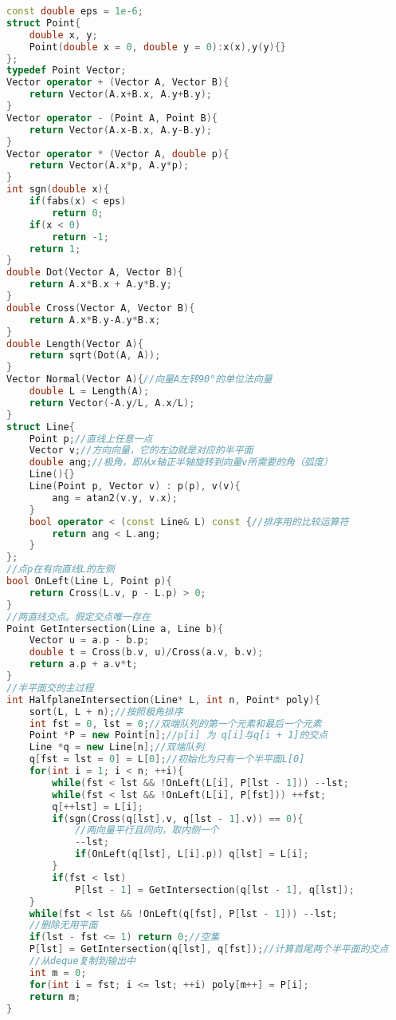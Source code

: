 \begin{lstlisting}[language=C++]
const double eps = 1e-6;
struct Point{
    double x, y;
    Point(double x = 0, double y = 0):x(x),y(y){}
};
typedef Point Vector;
Vector operator + (Vector A, Vector B){
    return Vector(A.x+B.x, A.y+B.y);
}
Vector operator - (Point A, Point B){
    return Vector(A.x-B.x, A.y-B.y);
}
Vector operator * (Vector A, double p){
    return Vector(A.x*p, A.y*p);
}
int sgn(double x){
    if(fabs(x) < eps)
        return 0;
    if(x < 0)
        return -1;
    return 1;
}
double Dot(Vector A, Vector B){
    return A.x*B.x + A.y*B.y;
}
double Cross(Vector A, Vector B){
    return A.x*B.y-A.y*B.x;
}
double Length(Vector A){
    return sqrt(Dot(A, A));
}
Vector Normal(Vector A){//向量A左转90°的单位法向量
    double L = Length(A);
    return Vector(-A.y/L, A.x/L);
}
struct Line{
    Point p;//直线上任意一点
    Vector v;//方向向量，它的左边就是对应的半平面
    double ang;//极角，即从x轴正半轴旋转到向量v所需要的角（弧度）
    Line(){}
    Line(Point p, Vector v) : p(p), v(v){
        ang = atan2(v.y, v.x);
    }
    bool operator < (const Line& L) const {//排序用的比较运算符
        return ang < L.ang;
    }
};
//点p在有向直线L的左侧
bool OnLeft(Line L, Point p){
    return Cross(L.v, p - L.p) > 0;
}
//两直线交点。假定交点唯一存在
Point GetIntersection(Line a, Line b){
    Vector u = a.p - b.p;
    double t = Cross(b.v, u)/Cross(a.v, b.v);
    return a.p + a.v*t;
}
//半平面交的主过程
int HalfplaneIntersection(Line* L, int n, Point* poly){
    sort(L, L + n);//按照极角排序
    int fst = 0, lst = 0;//双端队列的第一个元素和最后一个元素
    Point *P = new Point[n];//p[i] 为 q[i]与q[i + 1]的交点
    Line *q = new Line[n];//双端队列
    q[fst = lst = 0] = L[0];//初始化为只有一个半平面L[0]
    for(int i = 1; i < n; ++i){
        while(fst < lst && !OnLeft(L[i], P[lst - 1])) --lst;
        while(fst < lst && !OnLeft(L[i], P[fst])) ++fst;
        q[++lst] = L[i];
        if(sgn(Cross(q[lst].v, q[lst - 1].v)) == 0){
            //两向量平行且同向，取内侧一个
            --lst;
            if(OnLeft(q[lst], L[i].p)) q[lst] = L[i];
        }
        if(fst < lst)
            P[lst - 1] = GetIntersection(q[lst - 1], q[lst]);
    }
    while(fst < lst && !OnLeft(q[fst], P[lst - 1])) --lst;
    //删除无用平面
    if(lst - fst <= 1) return 0;//空集
    P[lst] = GetIntersection(q[lst], q[fst]);//计算首尾两个半平面的交点
    //从deque复制到输出中
    int m = 0;
    for(int i = fst; i <= lst; ++i) poly[m++] = P[i];
    return m;
}
\end{lstlisting}

